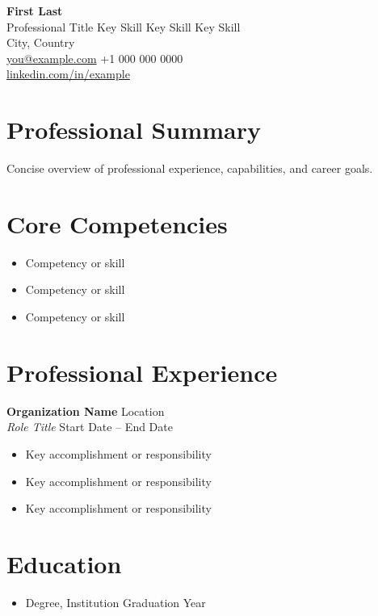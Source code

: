 \documentclass[11pt,a4paper]{article}
\begin{document}
\begin{center}
    {\LARGE \textbf{First Last}} \\
    Professional Title \textbar{} Key Skill \textbar{} Key Skill \textbar{} Key Skill \\
    City, Country \\
    \href{mailto:you@example.com}{you@example.com} \quad \textbar{} \quad +1 000 000 0000 \\
    \href{https://www.linkedin.com/in/example}{linkedin.com/in/example}
\end{center}

\vspace{1em}

\section*{Professional Summary}
Concise overview of professional experience, capabilities, and career goals.

\section*{Core Competencies}
\begin{itemize}[leftmargin=1.5em]
    \item Competency or skill
    \item Competency or skill
    \item Competency or skill
\end{itemize}

\section*{Professional Experience}
\textbf{Organization Name} \hfill Location \\
\textit{Role Title} \hfill Start Date -- End Date \\
\begin{itemize}[leftmargin=1.5em]
    \item Key accomplishment or responsibility
    \item Key accomplishment or responsibility
    \item Key accomplishment or responsibility
\end{itemize}

\section*{Education}
\begin{itemize}[leftmargin=1.5em]
    \item Degree, Institution \textemdash{} Graduation Year
\end{itemize}
\end{document}
